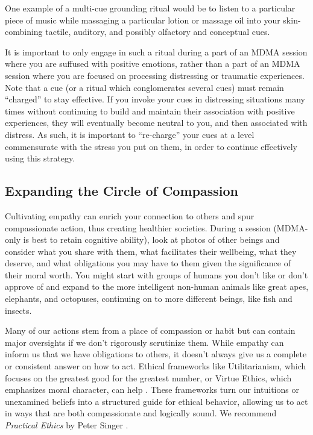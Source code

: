 \documentclass[12pt,letterpaper]{article}
\begin{document}
One example of a multi-cue grounding ritual would be to listen to a particular piece of music while massaging a particular lotion or massage oil into your skin-combining tactile, auditory, and possibly olfactory and conceptual cues.

It is important to only engage in such a ritual during a part of an MDMA session where you are suffused with positive emotions, rather than a part of an MDMA session where you are focused on processing distressing or traumatic experiences. Note that a cue (or a ritual which conglomerates several cues) must remain “charged” to stay effective. If you invoke your cues in distressing situations many times without continuing to build and maintain their association with positive experiences, they will eventually become neutral to you, and then associated with distress. As such, it is important to “re-charge” your cues at a level commensurate with the stress you put on them, in order to continue effectively using this strategy.
\subsection{Expanding the Circle of Compassion}
Cultivating empathy can enrich your connection to others and spur compassionate action, thus creating healthier societies. During a session (MDMA-only is best to retain cognitive ability), look at photos of other beings and consider what you share with them, what facilitates their wellbeing, what they deserve, and what obligations you may have to them given the significance of their moral worth. You might start with groups of humans you don't like or don't approve of and expand to the more intelligent non-human animals like great apes, elephants, and octopuses, continuing on to more different beings, like fish and insects.

Many of our actions stem from a place of compassion or habit but can contain major oversights if we don't rigorously scrutinize them. While empathy can inform us that we have obligations to others, it doesn't always give us a complete or consistent answer on how to act. Ethical frameworks like Utilitarianism, which focuses on the greatest good for the greatest number, or Virtue Ethics, which emphasizes moral character, can help \cite{IEPUtilitarianism,IEPVirtueEthics}. These frameworks turn our intuitions or unexamined beliefs into a structured guide for ethical behavior, allowing us to act in ways that are both compassionate and logically sound. We recommend \textit{Practical Ethics} by Peter Singer \cite{singerPractical}.  
\end{document}
